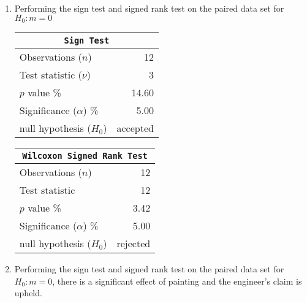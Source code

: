 \begin{enumerate}
\begin{table}[H]
	\end{table}
	\bigskip
	
	\item Performing the sign test and signed rank test on the paired data set for $ H_0 : m = 0 $ \\
	
	\begin{table}[H]
		\centering
		\begin{tabular}{@{}lr@{}}
			\toprule
			\multicolumn{2}{c}{\texttt{Sign Test}} \\
			\midrule
			Observations ($n$)         &        12 \\
			Test statistic ($\nu$)     &         3 \\
			$p$ value \%               &     14.60 \\
			Significance ($\alpha$) \% &      5.00 \\
			null hypothesis ($H_0$)    &  accepted \\
			\bottomrule
		\end{tabular}
		\qquad
		\begin{tabular}{@{}lr@{}}
			\toprule
			\multicolumn{2}{c}{\texttt{Wilcoxon Signed Rank Test}} \\
			\midrule
			Observations ($n$)         &        12 \\
			Test statistic             &        12 \\
			$p$ value \%               &      3.42 \\
			Significance ($\alpha$) \% &      5.00 \\
			null hypothesis ($H_0$)    &  rejected \\
			\bottomrule
		\end{tabular}
	\end{table}
	\bigskip
	
	
	\item Performing the sign test and signed rank test on the paired data set for $ H_0 : m = 0 $,
	there is a significant effect of painting and the engineer's claim is upheld.
	

\end{enumerate}
